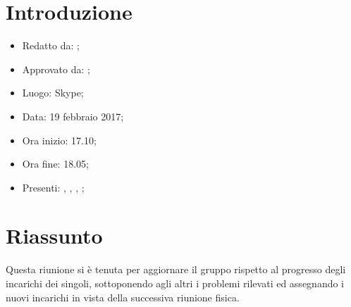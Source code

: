 \section{Introduzione}

	\begin{itemize}
		\item Redatto da: \MC;
		\item Approvato da: \AS;
		\item Luogo: Skype;
		\item Data: 19 febbraio 2017;
		\item Ora inizio: 17.10;
		\item Ora fine: 18.05;
		\item Presenti: \AS, \DS, \MC, \NS;		
	\end{itemize}

\section{Riassunto}
Questa riunione si è tenuta per aggiornare il gruppo rispetto al progresso degli incarichi dei singoli, sottoponendo agli altri i problemi rilevati ed assegnando i nuovi incarichi in vista della successiva riunione fisica.